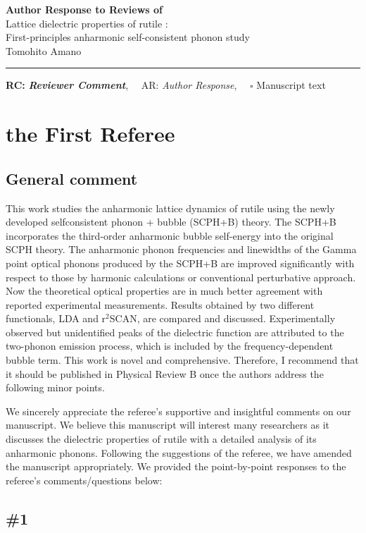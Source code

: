 \documentclass[luatex,onecolumn,showpacs,aps,preprint,prb,amsfonts,amsmath,amssymb,floatfix,groupedaddress, longbibliography]{revtex4-2}
\def\papertitle{Lattice dielectric properties of rutile \ce{TiO2}: \\
 First-principles anharmonic self-consistent phonon study}
\def\authors{Tomohito Amano }
\def\journal{}
\def\doi{}
\providecommand{\lettertitle}{Author Response to Reviews of}
\providecommand{\papertitle}{Title}
\providecommand{\authors}{Authors}
\begin{document}
{\Large\bf \lettertitle}\\[1em]
{\huge \papertitle}\\[1em]
{\authors}\\
\hrule

\hfill {\bfseries RC:} \textbf{\textit{Reviewer Comment}},\(\quad\) AR: \emph{Author Response}, \(\quad\square\) Manuscript text

\section{the First Referee}

\subsection{General comment}

\RC This work studies the anharmonic lattice dynamics of rutile  using the newly developed selfconsistent phonon + bubble (SCPH+B) theory. The SCPH+B incorporates the third-order anharmonic bubble self-energy into the original SCPH theory. The anharmonic phonon frequencies and linewidths of the Gamma point optical phonons produced by the SCPH+B are improved significantly with respect to those by harmonic calculations or conventional perturbative approach. Now the theoretical optical properties are in much better agreement with reported experimental measurements. Results obtained by two different functionals, LDA and $\mathrm{r}^2$SCAN, are compared and discussed.
Experimentally observed but unidentified peaks of the dielectric function are attributed to the two-phonon emission process, which is included by the frequency-dependent bubble term. This work is novel and comprehensive. Therefore, I recommend that it should be published in Physical Review B once the authors address the following minor points.

\AR We sincerely appreciate the referee’s supportive and insightful comments on our manuscript. We believe this manuscript will interest many researchers as it discusses the dielectric properties of rutile  with a detailed analysis of its anharmonic phonons. Following the suggestions of the referee, we have amended the manuscript appropriately. We provided the point-by-point responses to the referee’s comments/questions below:

\subsection{\#1}
\end{document}
